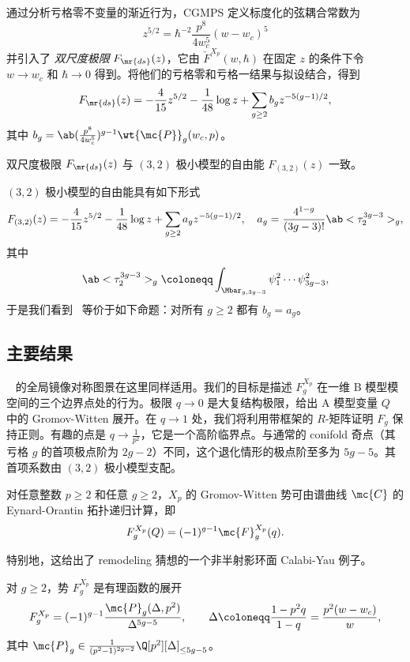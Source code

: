 通过分析亏格零不变量的渐近行为，CGMPS 定义标度化的弦耦合常数为
\[ z^{5/2} = \hbar^{-2} \frac{p^8}{4w_c^5}(w-w_c)^5 \]
并引入了 \textit{双尺度极限} \(F_{\mr{ds}}(z)\)，它由 \(\check{F}^{X_p}(w,\hbar)\) 在固定 \(z\) 的条件下令 \(w \to w_c\) 和 \(\hbar \to 0\) 得到。将他们的亏格零和亏格一结果与拟设结合，得到
\[ F_{\mr{ds}}(z) = -\frac{4}{15}z^{5/2} - \frac{1}{48}\log z + \sum_{g \geq 2} b_g z^{-5(g-1)/2}, \]
其中 \(b_g = \ab(\frac{p^8}{4w_c^5})^{g-1}\wt{\mc{P}}_g(w_c,p)\)。

\begin{conj}%
\label{conj:cgmps}
    双尺度极限 \(F_{\mr{ds}}(z)\) 与 \((3,2)\) 极小模型的自由能 \(F_{(3,2)}(z)\) 一致。
\end{conj}

\((3,2)\) 极小模型的自由能具有如下形式
\[ F_{(3,2)}(z) = -\frac{4}{15}z^{5/2} - \frac{1}{48}\log z + \sum_{g\geq2} a_g z^{-5(g-1)/2}, \quad a_g = \frac{4^{1-g}}{(3g-3)!}\ab<\tau_2^{3g-3}>_g, \]
其中
\[ \ab<\tau_2^{3g-3}>_g \coloneqq \int_{\Mbar_{g,3g-3}} \psi_1^2 \cdots \psi_{3g-3}^2, \]
于是我们看到~ 等价于如下命题：对所有 \(g \geq 2\) 都有 \(b_g = a_g\)。

\subsection{主要结果}%
\label{sub:The main results (Guo local P1)}

~ 的全局镜像对称图景在这里同样适用。我们的目标是描述 \(F_g^{X_p}\) 在一维 B 模型模空间的三个边界点处的行为。极限 \(q \to 0\) 是大复结构极限，给出 A 模型变量 \(Q\) 中的 Gromov-Witten 展开。在 \(q \to 1\) 处，我们将利用带框架的 \(R\)-矩阵证明 \(F_g\) 保持正则。有趣的点是 \(q \to \frac{1}{p^2}\)，它是一个高阶临界点。与通常的 conifold 奇点（其亏格 \(g\) 的首项极点阶为 \(2g-2\)）不同，这个退化情形的极点阶至多为 \(5g-5\)。其首项系数由 \((3,2)\) 极小模型支配。

\begin{thm}%
\label{thm:local P1 mirror symmetry}
    对任意整数 \(p \geq 2\) 和任意 \(g \geq 2\)，\(X_p\) 的 Gromov-Witten 势可由谱曲线 \(\mc{C}\) 的 Eynard-Orantin 拓扑递归计算，即
    \[ F_g^{X_p}(Q) = (-1)^{g-1}\mc{F}_g^{X_p}(q). \]
\end{thm}

特别地，这给出了 remodeling 猜想的一个非半射影环面 Calabi-Yau 例子。

\begin{thm}%
\label{thm:local P1 rationality}
    对 \(g \geq 2\)，势 \(F_g^{X_p}\) 是有理函数的展开
    \[ F_g^{X_p} = (-1)^{g-1}\frac{\mc{P}_g(\Delta,p^2)}{\Delta^{5g-5}}, \qquad \Delta \coloneqq \frac{1-p^2q}{1-q} = \frac{p^2(w-w_c)}{w}, \]
    其中 \(\mc{P}_g \in \frac{1}{(p^2-1)^{2g-2}}\Q[p^2][\Delta]_{\leq 5g-5}\)。
\end{thm}

